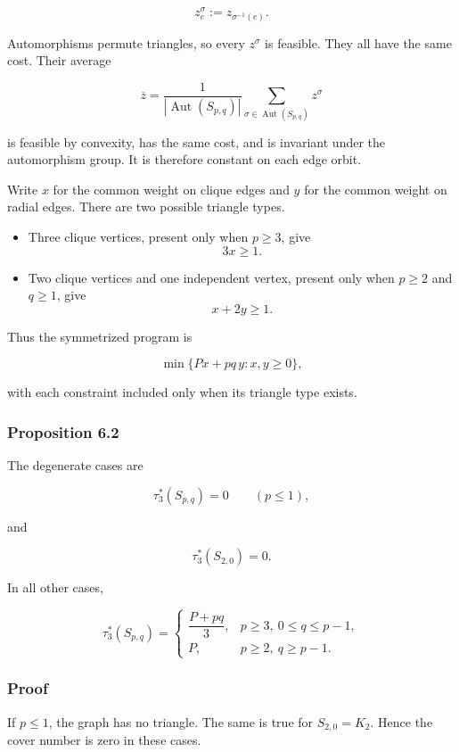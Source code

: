 \documentclass[
  11pt,
]{article}
\providecommand{\tightlist}{%
  \setlength{\itemsep}{0pt}\setlength{\parskip}{0pt}}
\begin{document}
\[
z^\sigma_e:=z_{\sigma^{-1}(e)}.
\]

Automorphisms permute triangles, so every \(z^\sigma\) is feasible. They
all have the same cost. Their average

\[
\overline z
=
\frac{1}{|\operatorname{Aut}(S_{p,q})|}
\sum_{\sigma\in\operatorname{Aut}(S_{p,q})}z^\sigma
\]

is feasible by convexity, has the same cost, and is invariant under the
automorphism group. It is therefore constant on each edge orbit.

Write \(x\) for the common weight on clique edges and \(y\) for the
common weight on radial edges. There are two possible triangle types.

\begin{itemize}
\tightlist
\item
  Three clique vertices, present only when \(p\ge3\), give \[
  3x\ge1.
  \]
\item
  Two clique vertices and one independent vertex, present only when
  \(p\ge2\) and \(q\ge1\), give \[
  x+2y\ge1.
  \]
\end{itemize}

Thus the symmetrized program is

\[
\min\{Px+pq\,y:x,y\ge0\},
\]

with each constraint included only when its triangle type exists.

\subsubsection{Proposition 6.2}\label{proposition-6.2}

The degenerate cases are

\[
\tau_3^*(S_{p,q})=0
\qquad
(p\le1),
\]

and

\[
\tau_3^*(S_{2,0})=0.
\]

In all other cases,

\[
\boxed{
\tau_3^*(S_{p,q})
=
\begin{cases}
\dfrac{P+pq}{3},
& p\ge3,\ 0\le q\le p-1,\\[3mm]
P,
& p\ge2,\ q\ge p-1.
\end{cases}
}
\]

\subsubsection{Proof}\label{proof-9}

If \(p\le1\), the graph has no triangle. The same is true for
\(S_{2,0}=K_2\). Hence the cover number is zero in these cases.
\end{document}
